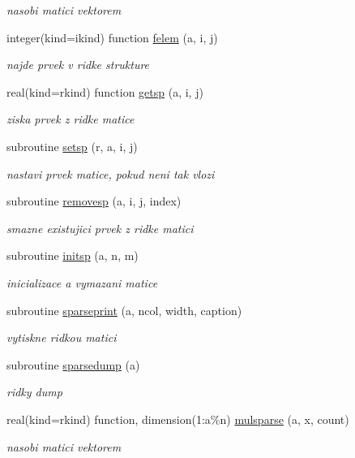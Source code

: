 \begin{DoxyCompactItemize}
\begin{DoxyCompactList}\small\item\em nasobi matici vektorem \end{DoxyCompactList}\item 
integer(kind=ikind) function \hyperlink{classmtx_ad87ede6266845e9f227148ef4d2d8fc8}{felem} (a, i, j)
\begin{DoxyCompactList}\small\item\em najde prvek v ridke strukture \end{DoxyCompactList}\item 
real(kind=rkind) function \hyperlink{classmtx_ad554ec86f71c2382069ededfe0ce5b8f}{getsp} (a, i, j)
\begin{DoxyCompactList}\small\item\em ziska prvek z ridke matice \end{DoxyCompactList}\item 
subroutine \hyperlink{classmtx_adf89a3418cd4c27c6d678b03bdcb9e12}{setsp} (r, a, i, j)
\begin{DoxyCompactList}\small\item\em nastavi prvek matice, pokud neni tak vlozi \end{DoxyCompactList}\item 
subroutine \hyperlink{classmtx_a4a9f30e7e4915927e3fb4a9eef74c67c}{removesp} (a, i, j, index)
\begin{DoxyCompactList}\small\item\em smazne existujici prvek z ridke matici \end{DoxyCompactList}\item 
subroutine \hyperlink{classmtx_a80356982f18920eb884fc3d702f8ab7d}{initsp} (a, n, m)
\begin{DoxyCompactList}\small\item\em inicializace a vymazani matice \end{DoxyCompactList}\item 
subroutine \hyperlink{classmtx_ac13cd002efa96de601cc9439598ecedb}{sparseprint} (a, ncol, width, caption)
\begin{DoxyCompactList}\small\item\em vytiskne ridkou matici \end{DoxyCompactList}\item 
subroutine \hyperlink{classmtx_ade6ff684a4964e220554d2e1dc9cb846}{sparsedump} (a)
\begin{DoxyCompactList}\small\item\em ridky dump \end{DoxyCompactList}\item 
real(kind=rkind) function, \*
dimension(1\-:a\%n) \hyperlink{classmtx_a05af464426600e96615bc292a3ecfc77}{mulsparse} (a, x, count)
\begin{DoxyCompactList}\small\item\em nasobi matici vektorem \end{DoxyCompactList}\end{DoxyCompactItemize}
